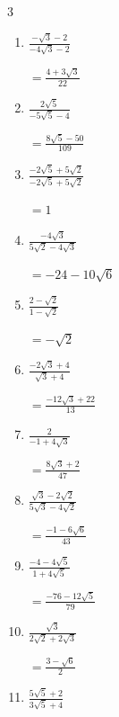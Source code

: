 \begin{multicols}{3}
\begin{enumerate}
        $\displaystyle =\frac{-3\sqrt{5}+11}{12}$

  \item $\displaystyle \frac{-\sqrt{3}-2}{-4\sqrt{3}-2}$

        $\displaystyle =\frac{4+3\sqrt{3}}{22}$

  \item $\displaystyle \frac{2\sqrt{5}}{-5\sqrt{5}-4}$

        $\displaystyle =\frac{8\sqrt{5}-50}{109}$

  \item $\displaystyle \frac{-2\sqrt{5}+5\sqrt{2}}{-2\sqrt{5}+5\sqrt{2}}$

        $\displaystyle =1$

  \item $\displaystyle \frac{-4\sqrt{3}}{5\sqrt{2}-4\sqrt{3}}$

        $\displaystyle =-24-10\sqrt{6}$

\columnbreak %

  \item $\displaystyle \frac{2-\sqrt{2}}{1-\sqrt{2}}$

        $\displaystyle =-\sqrt{2}$

  \item $\displaystyle \frac{-2\sqrt{3}+4}{\sqrt{3}+4}$

        $\displaystyle =\frac{-12\sqrt{3}+22}{13}$

  \item $\displaystyle \frac{2}{-1+4\sqrt{3}}$

        $\displaystyle =\frac{8\sqrt{3}+2}{47}$

  \item $\displaystyle \frac{\sqrt{3}-2\sqrt{2}}{5\sqrt{3}-4\sqrt{2}}$

        $\displaystyle =\frac{-1-6\sqrt{6}}{43}$

  \item $\displaystyle \frac{-4-4\sqrt{5}}{1+4\sqrt{5}}$

        $\displaystyle =\frac{-76-12\sqrt{5}}{79}$

\columnbreak %

  \item $\displaystyle \frac{\sqrt{3}}{2\sqrt{2}+2\sqrt{3}}$

        $\displaystyle =\frac{3-\sqrt{6}}{2}$

  \item $\displaystyle \frac{5\sqrt{5}+2}{3\sqrt{5}+4}$


\end{enumerate}
\end{multicols}
